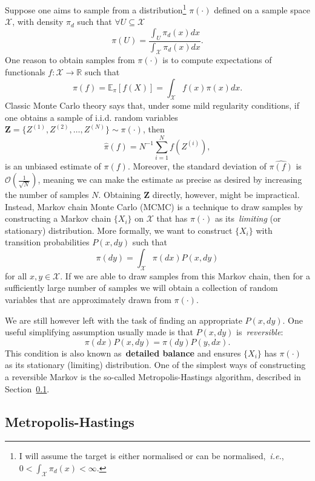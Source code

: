 Suppose one aims to sample from a distribution\footnote{I will assume the target is either normalised or can be normalised,~\textit{i.e.}, $ 0 < \int_{\mathcal{X}} \pi_d(x) <\infty$. } $\pi(\cdot)$ defined on a sample space $\mathcal{X}$, with density $\pi_d$ such that $\forall U \subseteq \mathcal{X}$
\[ \pi(U) = \frac{\int_{U} \pi_d(x)dx }{\int_{\mathcal{X}} \pi_d(x)dx}. \]
One reason to obtain samples from $\pi(\cdot)$ is to compute expectations of functionals $f :\mathcal{X} \to \mathbb{R}$ such that
\[ \pi(f) = \mathbb{E}_{\pi} [f(X)] = \int_{\mathcal{X}} f(x) \pi(x) dx. \] 
Classic Monte Carlo theory says that, under some mild regularity conditions, if one obtains a sample of i.i.d. random variables $\boldsymbol Z = \{ Z^{(1)}, Z^{(2)}, \ldots, Z^{(N)} \} \sim \pi(\cdot)$, then
\[ \hat{\pi}(f) = N^{-1}\sum_{i=1}^N f(Z^{(i)}), \]
is an unbiased estimate of $\pi(f)$.
Moreover, the standard deviation of $\hat{\pi(f)}$ is $\mathcal{O}(\frac{1}{\sqrt{N}})$, meaning we can make the estimate as precise as desired by increasing the number of samples $N$.
Obtaining $\boldsymbol Z$ directly, however, might be impractical.
Instead, Markov chain Monte Carlo (MCMC) is a technique to draw samples by constructing a Markov chain $\{X_i\}$ on $\mathcal{X}$ that has $\pi(\cdot)$ as its~\textit{limiting} (or stationary) distribution. 
More formally, we want to construct $\{X_i\}$ with transition probabilities $P(x, dy)$ such that
\[ \pi(dy) = \int_{\mathcal{X}} \pi(dx) P(x, dy)  \]
for all $x,y \in \mathcal{X}$.
If we are able to draw samples from this Markov chain, then for a sufficiently large number of samples we will obtain a collection of random variables that are approximately drawn from $\pi(\cdot)$.

We are still however left with the task of finding an appropriate $P(x, dy)$.
One useful simplifying assumption usually made is that $P(x, dy)$ is~\textit{reversible}:
\[ \pi(dx) P(x, dy) = \pi(dy) P(y, dx) .\]
This condition is also known as~\textbf{detailed balance} and ensures $\{X_i\}$ has $\pi(\cdot)$ as its stationary (limiting) distribution.
One of the simplest ways of constructing a reversible Markov is the so-called Metropolis-Hastings algorithm, described in Section~\ref{sec:MH}. %

\subsection{Metropolis-Hastings}
\label{sec:MH}

